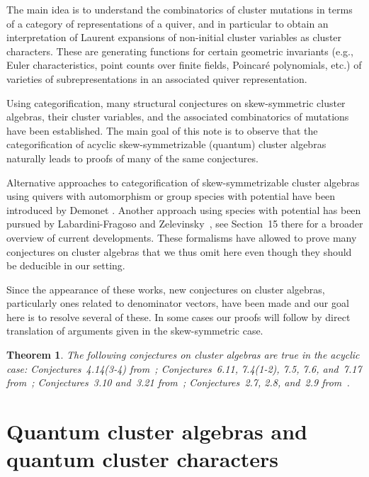 \documentclass[pdftex]{sigma}
\numberwithin{equation}{section}
\newtheorem{Theorem}{Theorem}
\begin{document}
 The main idea is to understand the combinatorics of cluster mutations in terms of a category of representations of a quiver, and in particular to obtain an interpretation of Laurent expansions of non-initial cluster variables as cluster characters. These are generating functions for certain geometric invariants (e.g., Euler characteristics, point counts over finite fields, Poincar\'e polynomials, etc.) of varieties of subrepresentations in an associated quiver representation.

 Using categorification, many structural conjectures on skew-symmetric cluster algebras, their cluster variables, and the associated combinatorics of mutations have been established. The main goal of this note is to observe that the categorification of acyclic skew-symmetrizable (quantum) cluster algebras \cite{rupel1,rupel2} naturally leads to proofs of many of the same conjectures.

 Alternative approaches to categorification of skew-symmetrizable cluster algebras using quivers with automorphism or group species with potential have been introduced by Demonet \cite{demonet1,demonet2}. Another approach using species with potential has been pursued by Labardini-Fragoso and Zelevinsky~\cite{labardini-zelevinsky}, see Section~15 there for a broader overview of current developments. These formalisms have allowed to prove many conjectures on cluster algebras that we thus omit here even though they should be deducible in our setting.

 Since the appearance of these works, new conjectures on cluster algebras, particularly ones related to denominator vectors, have been made and our goal here is to resolve several of these. In some cases our proofs will follow by direct translation of arguments given in the skew-symmetric case.
 \begin{Theorem} \label{thm:main}
 The following conjectures on cluster algebras are true in the acyclic case: Conjectures~{\rm 4.14(3-4)} from~{\rm \cite{FZ03}}; Conjectures~{\rm 6.11}, {\rm 7.4(1-2)}, {\rm 7.5}, {\rm 7.6}, and~{\rm 7.17} from~{\rm \cite{fomin-zelevinsky4}}; Conjectures~{\rm 3.10} and~{\rm 3.21} from~{\rm \cite{reading-speyer}}; Conjectures~{\rm 2.7}, {\rm 2.8}, and~{\rm 2.9} from~{\rm \cite{reading-stella}}.
 \end{Theorem}

\section{Quantum cluster algebras and quantum cluster characters}\label{sec:qca}
\end{document}

